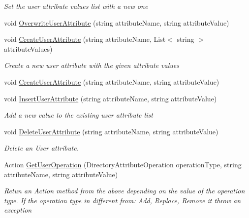 \begin{DoxyCompactItemize}
\begin{DoxyCompactList}\small\item\em Set the user attribute values list with a new one \end{DoxyCompactList}\item 
void \hyperlink{class_l_d_a_p_library_1_1_fake_ldap_user_a624c08c87cd235bc6c424000443fdcaa}{Overwrite\+User\+Attribute} (string attribute\+Name, string attribute\+Value)
\item 
void \hyperlink{class_l_d_a_p_library_1_1_fake_ldap_user_a43d9c13866411b42b3a96b1539d97bf6}{Create\+User\+Attribute} (string attribute\+Name, List$<$ string $>$ attribute\+Values)
\begin{DoxyCompactList}\small\item\em Create a new user attribute with the given attribute values \end{DoxyCompactList}\item 
void \hyperlink{class_l_d_a_p_library_1_1_fake_ldap_user_a61b894b8f3d68a629175c74f8109a259}{Create\+User\+Attribute} (string attribute\+Name, string attribute\+Value)
\item 
void \hyperlink{class_l_d_a_p_library_1_1_fake_ldap_user_a6774a1815781480d02bd5f54c903e1cd}{Insert\+User\+Attribute} (string attribute\+Name, string attribute\+Value)
\begin{DoxyCompactList}\small\item\em Add a new value to the existing user attribute list \end{DoxyCompactList}\item 
void \hyperlink{class_l_d_a_p_library_1_1_fake_ldap_user_aa60d7cada3a25c51850ccd4466910035}{Delete\+User\+Attribute} (string attribute\+Name, string attribute\+Value)
\begin{DoxyCompactList}\small\item\em Delete an User attribute. \end{DoxyCompactList}\item 
Action \hyperlink{class_l_d_a_p_library_1_1_fake_ldap_user_af9c494f251bf32394de48296b1f5ac91}{Get\+User\+Operation} (Directory\+Attribute\+Operation operation\+Type, string attribute\+Name, string attribute\+Value)
\begin{DoxyCompactList}\small\item\em Retun an Action method from the above depending on the value of the operation type. If the operation type in different from\+: Add, Replace, Remove it throw an exception \end{DoxyCompactList}\end{DoxyCompactItemize}


